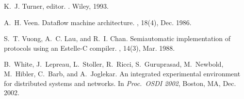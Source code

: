 \begin{thebibliography}{10}
K.~J. Turner, editor.
.
\newblock Wiley, 1993.

A.~H. Veen.
\newblock Dataflow machine architecture.
, 18(4), Dec. 1986.

S.~T. Vuong, A.~C. Lau, and R.~I. Chan.
\newblock Semiautomatic implementation of protocols using an {E}stelle-{C}
  compiler.
, 14(3), Mar. 1988.

B.~White, J.~Lepreau, L.~Stoller, R.~Ricci, S.~Guruprasad, M.~Newbold,
  M.~Hibler, C.~Barb, and A.~Joglekar.
\newblock An integrated experimental environment for distributed systems and
  networks.
\newblock In {\em Proc.\ OSDI 2002}, Boston, MA, Dec. 2002.

\end{thebibliography}
